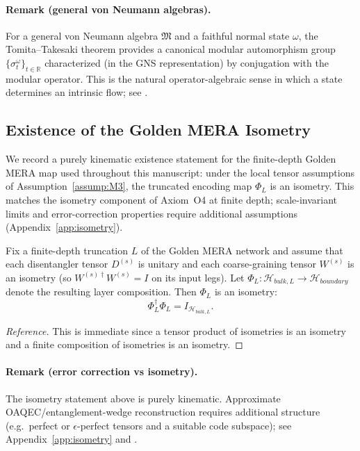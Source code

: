 \paragraph{Remark (general von Neumann algebras).}
For a general von Neumann algebra $\mathfrak{M}$ and a faithful normal state $\omega$, the Tomita--Takesaki theorem provides a canonical modular automorphism group $\{\sigma_t^\omega\}_{t\in\mathbb{R}}$ characterized (in the GNS representation) by conjugation with the modular operator. This is the natural operator-algebraic sense in which a state determines an intrinsic flow; see \cite{Takesaki2002,ConnesRovelli1994}.

\subsection{Existence of the Golden MERA Isometry}
We record a purely kinematic existence statement for the finite-depth Golden MERA map used throughout this manuscript: under the local tensor assumptions of Assumption~\ref{assump:M3}, the truncated encoding map $\Phi_L$ is an isometry. This matches the isometry component of Axiom~O4 at finite depth; scale-invariant limits and error-correction properties require additional assumptions (Appendix~\ref{app:isometry}).

\begin{theorem}
\label{thm:golden_isometry}
Fix a finite-depth truncation $L$ of the Golden MERA network and assume that each disentangler tensor $D^{(s)}$ is unitary and each coarse-graining tensor $W^{(s)}$ is an isometry (so $W^{(s)\dagger}W^{(s)}=I$ on its input legs). Let $\Phi_L:\mathcal{H}_{bulk,L}\to\mathcal{H}_{boundary}$ denote the resulting layer composition. Then $\Phi_L$ is an isometry:
\begin{equation}
    \Phi_L^\dagger \Phi_L = I_{\mathcal{H}_{bulk,L}}.
\end{equation}
\end{theorem}
\begin{proof}[Reference]
This is immediate since a tensor product of isometries is an isometry and a finite composition of isometries is an isometry.
\end{proof}
\paragraph{Remark (error correction vs isometry).}
The isometry statement above is purely kinematic. Approximate OAQEC/entanglement-wedge reconstruction requires additional structure (e.g.\ perfect or $\epsilon$-perfect tensors and a suitable code subspace); see Appendix~\ref{app:isometry} and \cite{Pastawski2015,Harlow2017}.

